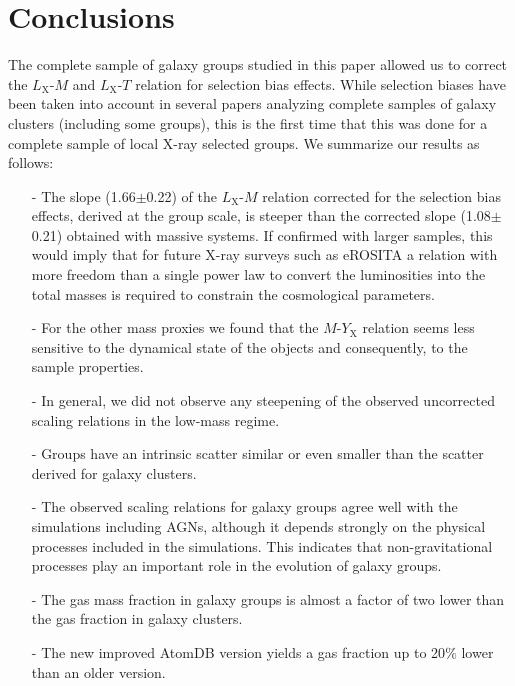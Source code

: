 \documentclass{aa} %
\begin{document}
\section{Conclusions} \label{conclusion} 
The complete sample of galaxy
groups studied in this paper allowed us to correct the
$L_{\text{X}}$-$M$ and $L_{\text{X}}$-$T$ relation for selection bias
effects. While selection biases have been taken into account in
several papers analyzing complete samples of galaxy clusters
(including some groups), this is the first time that this was done for a
complete sample of local X-ray selected groups. We summarize our results as follows:\\
\begin{enumerate}
\item[-] The slope (1.66$\pm$0.22) of the $L_{\text{X}}$-$M$ relation corrected for the selection
  bias effects, derived at the group scale, is steeper than the corrected slope (1.08$\pm$0.21) obtained with massive systems.
  If confirmed with larger samples, this would imply that for future X-ray surveys such as eROSITA a relation with more freedom than a single power law to convert the   luminosities into the total masses is required to constrain the
  cosmological parameters.
\item[-] For the other mass proxies we found that the
  $M$-$Y_{\text{X}}$ relation seems less sensitive to the dynamical state of the objects and consequently, to the sample
  properties.
\item[-] In general, we did not observe any steepening of the observed uncorrected scaling  relations in the low-mass regime.
\item[-] Groups have an intrinsic scatter similar or even smaller
  than the scatter derived for galaxy clusters.
\item[-] The observed scaling relations for galaxy groups agree well with the simulations including AGNs, although it depends
  strongly on the physical processes included in the simulations. This
  indicates that non-gravitational processes play an important
  role in the evolution of galaxy groups.
\item[-] The gas mass fraction in galaxy groups is almost a factor of two lower than the gas fraction in galaxy clusters.  
\item[-] The new improved AtomDB version yields a gas fraction up to 20$\%$ lower than an older version.
\end{enumerate}
\end{document}
